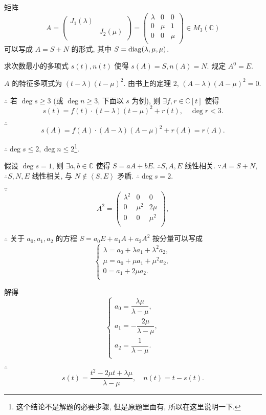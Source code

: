\documentclass{ctexart}
\begin{document}
\addtocounter{exercise}{2}
\begin{exercise}%
    矩阵
    \[A=\begin{pmatrix}
        J_1(\lambda) \\
        & J_2(\mu) \\
    \end{pmatrix}=\begin{pmatrix}
        \lambda & 0 & 0 \\
        0 & \mu & 1 \\
        0 & 0 & \mu \\
    \end{pmatrix}\in M_3(\mathbb{C})\]
    可以写成 $A=S+N$ 的形式, 其中 $S=\operatorname{diag} (\lambda,\mu,\mu)$.

    求次数最小的多项式 $s(t),n(t)$ 使得 $s(A)=S,n(A)=N$. 规定 $A^0=E$.
\end{exercise}
\begin{solution}
    $A$ 的特征多项式为 $(t-\lambda)(t-\mu)^2$. 由书上的定理 2, $(A-\lambda)(A-\mu)^2=0$.

    $\therefore$ 若 $\deg s\geq3$ (或 $\deg n\geq3$, 下面以 $s$ 为例), 则 $\exists f,r\in\mathbb{C}[t]$ 使得
    \[s(t)=f(t)\cdot(t-\lambda)(t-\mu)^2+r(t),\quad\deg r<3.\]

    $\therefore$
    \[s(A)=f(A)\cdot(A-\lambda)(A-\mu)^2+r(A)=r(A).\]

    $\therefore\deg s\leq 2,\deg n\leq 2$\footnote{这个结论不是解题的必要步骤, 但是原题里面有, 所以在这里说明一下.}.

    假设 $\deg s=1$, 则 $\exists a,b\in\mathbb{C}$ 使得 $S=aA+bE$. $\therefore S,A,E$ 线性相关. $\because A=S+N$, $\therefore S,N,E$ 线性相关, 与 $N\notin\left<S,E\right>$ 矛盾. $\therefore\deg s=2$.

    $\because$
    \[A^2=\begin{pmatrix}
        \lambda^2 & 0 & 0 \\
        0 & \mu^2 & 2\mu \\
        0 & 0 & \mu^2 \\
    \end{pmatrix},\]

    $\therefore$ 关于 $a_0,a_1,a_2$ 的方程 $S=a_0E+a_1A+a_2A^2$ 按分量可以写成
    \[\begin{cases}
        \lambda=a_0+\lambda a_1+\lambda^2a_2, \\
        \mu=a_0+\mu a_1+\mu^2a_2, \\
        0=a_1+2\mu a_2. \\
    \end{cases}\]

    解得
    \[\begin{cases}
        a_0=\dfrac{\lambda\mu}{\lambda-\mu}, \\[8pt]
        a_1=-\dfrac{2\mu}{\lambda-\mu}, \\[8pt]
        a_2=\dfrac{1}{\lambda-\mu}. \\
    \end{cases}\]

    $\therefore$
    \[s(t)=\dfrac{t^2-2\mu t+\lambda\mu}{\lambda-\mu},\quad n(t)=t-s(t).\]
\end{solution}
\end{document}

